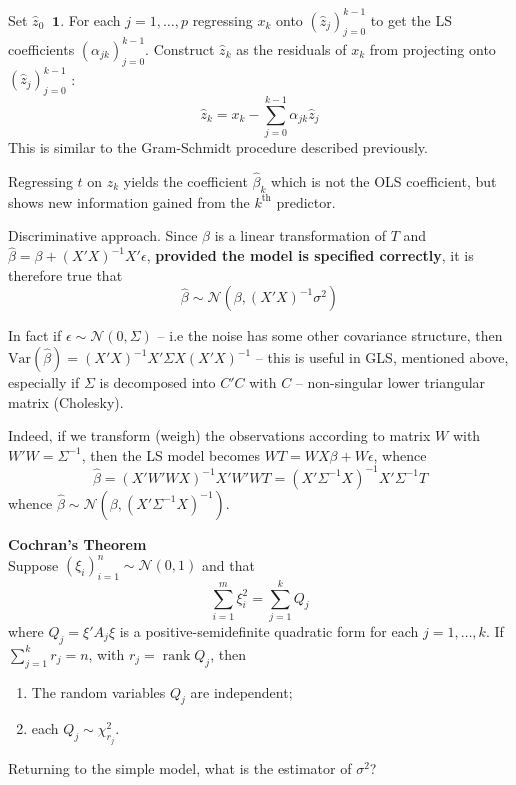\documentclass[a4paper]{article}
\newcommand{\brac}[1]{{\left ( #1 \right )}}
\newcommand{\Ncal}{\mathcal{N}}
\newcommand{\Var}[0]{{\text{Var}}}
\newcommand{\one}{\mathbf{1}}
\newcommand{\rank}{\mathop{\text{rank}}\nolimits}
\newcommand{\defn}{\mathop{\overset{\Delta}{=}}\nolimits}
\begin{document}

Set $\hat{z}_0 \defn \one$. For each $j=1,\ldots,p$ regressing $x_k$ onto $\brac{\hat{z}_j}_{j=0}^{k-1}$ to get the LS coefficients $\brac{\alpha_{jk}}_{j=0}^{k-1}$.
Construct $\hat{z}_k$ as the residuals of $x_k$ from projecting onto $\brac{\hat{z}_j}_{j=0}^{k-1}$ :
\[\hat{z}_k = x_k - \sum_{j=0}^{k-1} \alpha_{jk} \hat{z}_j\]
This is similar to the Gram-Schmidt procedure described previously.

Regressing $t$ on $z_k$ yields the coefficient $\hat{\beta}_k$ which is not the OLS coefficient, but shows new information gained from the $k^\text{th}$ predictor.

Discriminative approach.
Since $\hat{\beta}$ is a linear transformation of $T$ and $\hat{\beta} = \beta + \brac{X'X}^{-1}X'\epsilon$, \textbf{provided the model is specified correctly}, it is therefore true that
\[\hat{\beta}\sim\Ncal\brac{\beta,\brac{X'X}^{-1} \sigma^2}\]

In fact if $\epsilon\sim \Ncal\brac{0,\Sigma}$ -- i.e the noise has some other covariance structure, then $\Var(\hat{\beta}) = \brac{X'X}^{-1}X'\Sigma X\brac{X'X}^{-1}$ -- this is useful in GLS, mentioned above, especially if $\Sigma$ is decomposed into $C'C$ with $C$ -- non-singular lower triangular matrix (Cholesky).

Indeed, if we transform (weigh) the observations according to matrix $W$ with $W'W = \Sigma^{-1}$, then the LS model becomes $WT=WX\beta + W\epsilon$, whence
\[\hat{\beta} = \brac{X'W'WX}^{-1}X'W'WT = \brac{X'\Sigma^{-1}X}^{-1}X'\Sigma^{-1}T\]
whence $\hat{\beta}\sim\Ncal\brac{\beta, \brac{X'\Sigma^{-1}X}^{-1}}$.

\noindent\textbf{Cochran's Theorem} \hfill\\
Suppose $\brac{\xi_i}_{i=1}^n \sim\Ncal(0, 1)$ and that
\[\sum_{i=1}^m \xi_i^2 = \sum_{j=1}^k Q_j\]
where $Q_j = \xi' A_j \xi$ is a positive-semidefinite quadratic form for each $j=1,\ldots,k$.
If $\sum_{j=1}^k r_j = n$, with $r_j = \rank{Q_j}$, then \begin{enumerate}
	\item The random variables $Q_j$ are independent;
	\item each $Q_j\sim \chi^2_{r_j}$.
\end{enumerate}

Returning to the simple model, what is the estimator of $\sigma^2$?
\end{document}

